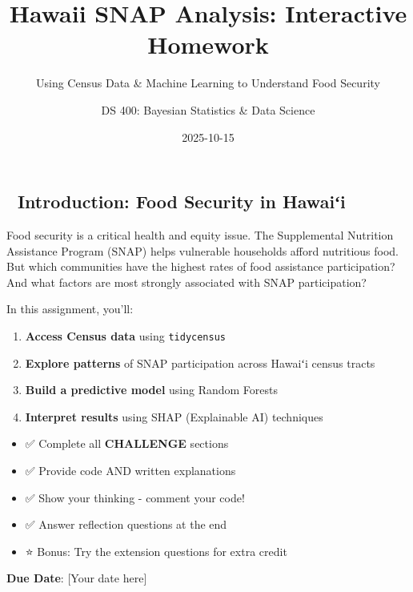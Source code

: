 \documentclass[
  letterpaper,
  DIV=11,
  numbers=noendperiod]{scrartcl}
\title{Hawaii SNAP Analysis: Interactive Homework}
\subtitle{Using Census Data \& Machine Learning to Understand Food
Security}
\author{DS 400: Bayesian Statistics \& Data Science}
\date{2025-10-15}
\providecommand{\tightlist}{%
  \setlength{\itemsep}{0pt}\setlength{\parskip}{0pt}}\usepackage{longtable,booktabs,array}
\begin{document}
\maketitle


\subsection{🌺 Introduction: Food Security in
Hawaiʻi}\label{introduction-food-security-in-hawaiux2bbi}

Food security is a critical health and equity issue. The Supplemental
Nutrition Assistance Program (SNAP) helps vulnerable households afford
nutritious food. But which communities have the highest rates of food
assistance participation? And what factors are most strongly associated
with SNAP participation?

In this assignment, you'll:

\begin{enumerate}
\def\labelenumi{\arabic{enumi}.}
\tightlist
\item
  \textbf{Access Census data} using \texttt{tidycensus}
\item
  \textbf{Explore patterns} of SNAP participation across Hawaiʻi census
  tracts
\item
  \textbf{Build a predictive model} using Random Forests
\item
  \textbf{Interpret results} using SHAP (Explainable AI) techniques
\end{enumerate}

\begin{tcolorbox}[enhanced jigsaw, title=\textcolor{quarto-callout-important-color}{\faExclamation}\hspace{0.5em}{Homework Requirements}, titlerule=0mm, coltitle=black, colbacktitle=quarto-callout-important-color!10!white, colback=white, left=2mm, toprule=.15mm, opacitybacktitle=0.6, toptitle=1mm, colframe=quarto-callout-important-color-frame, bottomtitle=1mm, arc=.35mm, bottomrule=.15mm, breakable, leftrule=.75mm, opacityback=0, rightrule=.15mm]

\begin{itemize}
\tightlist
\item
  ✅ Complete all \textbf{CHALLENGE} sections
\item
  ✅ Provide code AND written explanations
\item
  ✅ Show your thinking - comment your code!
\item
  ✅ Answer reflection questions at the end
\item
  ⭐ Bonus: Try the extension questions for extra credit
\end{itemize}

\textbf{Due Date}: {[}Your date here{]}

\end{tcolorbox}
\end{document}
